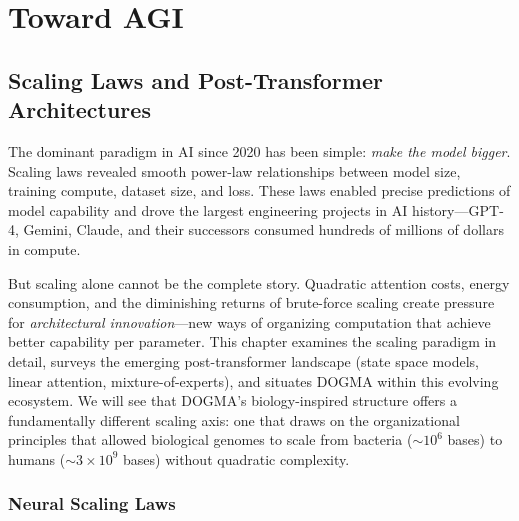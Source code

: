 
\part{Toward AGI}

\chapter{Scaling Laws and Post-Transformer Architectures}
\label{ch:scaling-post-transformer}


\noindent
The dominant paradigm in AI since 2020 has been simple: \emph{make the model bigger}. Scaling laws revealed smooth power-law relationships between model size, training compute, dataset size, and loss. These laws enabled precise predictions of model capability and drove the largest engineering projects in AI history---GPT-4, Gemini, Claude, and their successors consumed hundreds of millions of dollars in compute.

But scaling alone cannot be the complete story. Quadratic attention costs, energy consumption, and the diminishing returns of brute-force scaling create pressure for \emph{architectural innovation}---new ways of organizing computation that achieve better capability per parameter. This chapter examines the scaling paradigm in detail, surveys the emerging post-transformer landscape (state space models, linear attention, mixture-of-experts), and situates DOGMA within this evolving ecosystem. We will see that DOGMA's biology-inspired structure offers a fundamentally different scaling axis: one that draws on the organizational principles that allowed biological genomes to scale from bacteria ($\sim$$10^6$ bases) to humans ($\sim$$3 \times 10^9$ bases) without quadratic complexity.

\section{Neural Scaling Laws}
\label{sec:scaling-laws}

